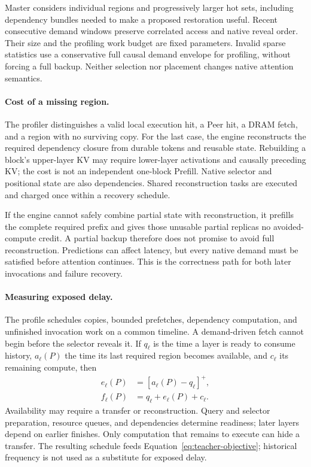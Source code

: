 Master considers individual regions and progressively larger hot sets,
including dependency bundles needed to make a proposed restoration
useful. Recent consecutive demand windows preserve correlated access
and native reveal order. Their size and the profiling work budget are
fixed parameters. Invalid sparse statistics use a conservative full
causal demand envelope for profiling, without forcing a full backup.
Neither selection nor placement changes native attention semantics.

\paragraph{Cost of a missing region.}
The profiler distinguishes a valid local execution hit, a Peer hit, a
DRAM fetch, and a region with no surviving copy. For the last case,
the engine reconstructs the required dependency closure from durable
tokens and reusable state. Rebuilding a block's upper-layer KV may
require lower-layer activations and causally preceding KV; the cost is
not an independent one-block Prefill. Native selector and positional
state are also dependencies. Shared reconstruction tasks are executed
and charged once within a recovery schedule.

If the engine cannot safely combine partial state with reconstruction,
it prefills the complete required prefix and gives those unusable
partial replicas no avoided-compute credit. A partial backup therefore
does not promise to avoid full reconstruction. Predictions can affect
latency, but every native demand must be satisfied before attention
continues. This is the correctness path for both later invocations
and failure recovery.

\paragraph{Measuring exposed delay.}
The profile schedules copies, bounded prefetches, dependency computation,
and unfinished invocation work on a common timeline. A demand-driven
fetch cannot begin before the selector reveals it. If $q_\ell$ is the
time a layer is ready to consume history, $a_\ell(P)$ the time its last
required region becomes available, and $c_\ell$ its remaining compute,
then
\begin{equation}
 \begin{aligned}
 e_\ell(P)&=[a_\ell(P)-q_\ell]^+,\\
 f_\ell(P)&=q_\ell+e_\ell(P)+c_\ell.
 \end{aligned}
 \label{eq:teacher-overlap}
\end{equation}
Availability may require a transfer or reconstruction. Query and
selector preparation, resource queues, and dependencies determine
readiness; later layers depend on earlier finishes. Only computation
that remains to execute can hide a transfer. The resulting schedule
feeds Equation~\ref{eq:teacher-objective}; historical frequency is not
used as a substitute for exposed delay.

